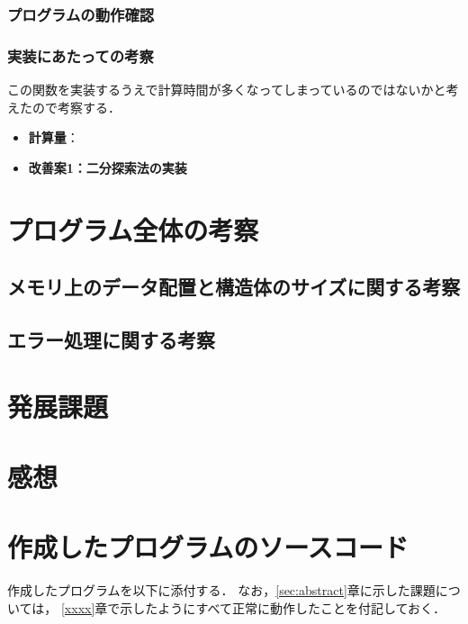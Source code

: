     \subsubsection{プログラムの動作確認}

    \subsubsection{実装にあたっての考察}
    この関数を実装するうえで計算時間が多くなってしまっているのではないかと考えたので考察する．
    \begin{itemize}
      \item \textbf{計算量}：
        \texttt{}
      \item \textbf{改善案1：二分探索法の実装}
    \end{itemize}
\section{プログラム全体の考察}\label{cosider}
  \subsection{メモリ上のデータ配置と構造体のサイズに関する考察}\label{cosider1}
  \subsection{エラー処理に関する考察}\label{cosider2}


\section{発展課題}
  


\section{感想}


\section{作成したプログラムのソースコード}

作成したプログラムを以下に添付する．
なお，\ref{sec:abstract}章に示した課題については，
\ref{xxxx}章で示したようにすべて正常に動作したことを付記しておく．

